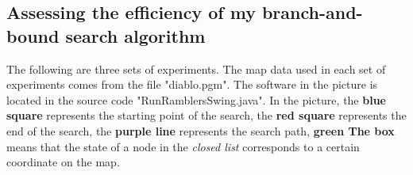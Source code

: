 \documentclass[
]{article}
\begin{document}
\hypertarget{header-n56}{%
\subsection{Assessing the efficiency of my branch-and-bound search
algorithm}\label{header-n56}}

The following are three sets of experiments. The map data used in each
set of experiments comes from the file "diablo.pgm". The software in the
picture is located in the source code "RunRamblersSwing.java". In the
picture, the \textbf{blue square} represents the starting point of the
search, the \textbf{red square} represents the end of the search, the
\textbf{purple line} represents the search path, \textbf{green The box}
means that the state of a node in the \emph{closed list} corresponds to
a certain coordinate on the map.
\end{document}
